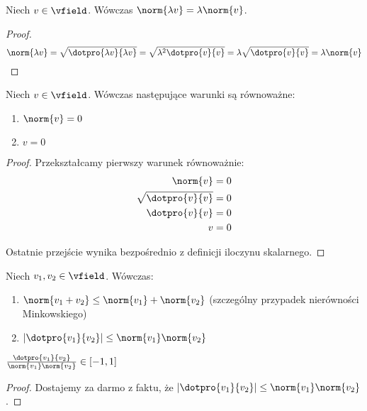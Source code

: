\begin{fact}
Niech \(v \in \vfield\). Wówczas \( \norm{\lambda v} = \lambda \norm{v}\).

\end{fact}
\begin{proof}
\[
\norm{\lambda v} = \sqrt{\dotpro{\lambda v}{\lambda v}} = \sqrt{\lambda^2 \dotpro{v}{v}} = \lambda \sqrt{\dotpro{v}{v}} = \lambda \norm{v}
\]
\end{proof}
\begin{fact}
Niech \(v \in \vfield\). Wówczas następujące warunki są równoważne:

\begin{enumerate}
    \item \(\norm{v} = 0\)
    \item \(v = 0\)
\end{enumerate}

\end{fact}
\begin{proof}
Przekształcamy pierwszy warunek równoważnie: 
\begin{align*}
    \norm{v} = 0 \\
    \sqrt{\dotpro{v}{v}} = 0 \\ 
    \dotpro{v}{v} = 0 \\
    v = 0
\end{align*}

Ostatnie przejście wynika bezpośrednio z definicji iloczynu skalarnego.
\end{proof}

\begin{fact}
Niech \(v_1, v_2 \in \vfield\). Wówczas:

\begin{enumerate}
    \item \(\norm{v_1 + v_2} \leq \norm{v_1} + \norm{v_2}\) (szczególny przypadek nierówności Minkowskiego)
    \item \( | \dotpro{v_1}{v_2} | \leq \norm{v_1} \norm{v_2} \)
\end{enumerate}

\end{fact}

\begin{fact}
     \( \frac{\dotpro{v_1}{v_2}}{\norm{v_1} \norm{v_2}} \in [-1, 1] \)
\end{fact}
\begin{proof}
Dostajemy za darmo z faktu, że \( | \dotpro{v_1}{v_2} | \leq \norm{v_1} \norm{v_2} \).
\end{proof}

